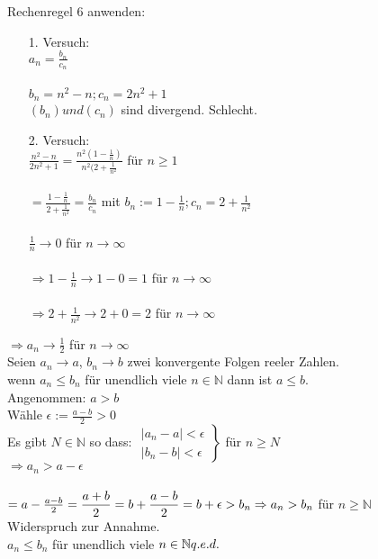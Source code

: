 Rechenregel 6 anwenden:\\
\begin{itemize}
\item[1.]{Versuch:\\
$a_n = \frac{b_n}{c_n}$\\ 
\\
$b_n = n^2 -n; c_n = 2n^2 + 1$\\
$(b_n) und (c_n)$ sind divergend. Schlecht.}
\item[2.]{Versuch:\\
$\displaystyle\frac{n^2 - n}{2n^2 + 1} = \displaystyle\frac{n^2(1 - \displaystyle\frac{1}{n})}{n^2(2 + \displaystyle\frac{1}{n^2}}$ für $n \geq 1$ \\ \\
$= \displaystyle\frac{1 - \frac{1}{n}}{2 + \frac{1}{n^2}} = \displaystyle\frac{b_n}{c_n}$ mit $b_n := 1 - \displaystyle\frac{1}{n}; c_n = 2 + \displaystyle\frac{1}{n^2}$\\
\\
$\displaystyle\frac{1}{n} \to 0$ für $n \to \infty $
\\ \\ $\Rightarrow 1 - \displaystyle\frac{1}{n} \to 1 - 0 = 1$ für $n \to \infty$
\\ \\ $\Rightarrow 2 + \displaystyle\frac{1}{n^2} \to 2 + 0 = 2$ für $n \to \infty$}
\end{itemize}

$\Rightarrow a_n \to \frac{1}{2}$ für $n \to \infty$\\

Seien $a_n \to a$, $b_n \to b$ zwei konvergente Folgen reeler Zahlen.\\
wenn $a_n \leq b_n$ für unendlich viele $n \in \mathbb{N}$ dann ist $a \leq b$. \\
\bew
Angenommen: $a > b$\\

Wähle $\epsilon := \displaystyle\frac{a - b}{2} > 0$\\
Es gibt $N \in \mathbb{N}$ so dass:
$
\left.
\begin{array}{ll}
\mid a_n - a \mid  < \epsilon \\
\mid b_n - b \mid  < \epsilon
\end{array} \right\rbrace$ für $n \geq N$\\
$\Rightarrow a_n > a - \epsilon$\\ \\
$= a - \frac{a - b}{2} = \displaystyle\frac{a + b}{2} = b + \displaystyle\frac{a - b}{2}\\
\\
= b + \epsilon > b_n \Rightarrow a_n > b_n$ für $n \geq \mathbb{N}$\\
Widerspruch zur Annahme.\\
$a_n \leq b_n$ für unendlich viele $n \in \mathbb{N} \hfill q.e.d.$

